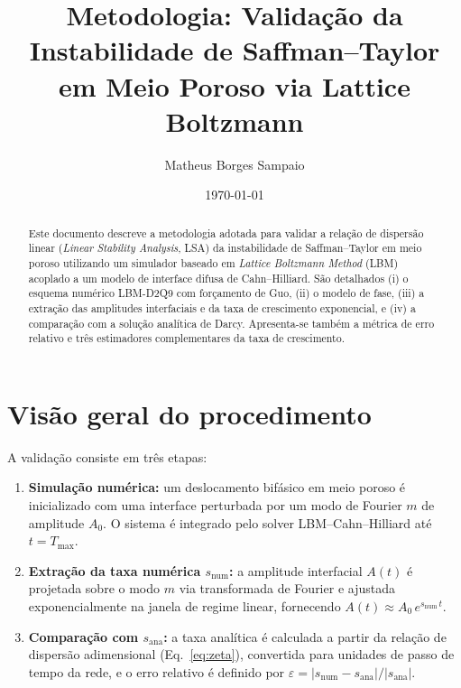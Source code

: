 \documentclass[11pt,a4paper]{article}
\title{Metodologia: Validação da Instabilidade de Saffman--Taylor \\
       em Meio Poroso via Lattice Boltzmann}
\author{Matheus Borges Sampaio}
\date{\today}
\begin{document}
\maketitle

\begin{abstract}
Este documento descreve a metodologia adotada para validar a relação de
dispersão linear (\textit{Linear Stability Analysis}, LSA) da instabilidade
de Saffman--Taylor em meio poroso utilizando um simulador baseado em
\textit{Lattice Boltzmann Method} (LBM) acoplado a um modelo de interface
difusa de Cahn--Hilliard. São detalhados (i) o esquema numérico LBM-D2Q9 com
forçamento de Guo, (ii) o modelo de fase, (iii) a extração das amplitudes
interfaciais e da taxa de crescimento exponencial, e (iv) a comparação com a
solução analítica de Darcy. Apresenta-se também a métrica de erro relativo
e três estimadores complementares da taxa de crescimento.
\end{abstract}

\section{Visão geral do procedimento}

A validação consiste em três etapas:

\begin{enumerate}
    \item \textbf{Simulação numérica:} um deslocamento bifásico em meio
    poroso é inicializado com uma interface perturbada por um modo de
    Fourier $m$ de amplitude $A_0$. O sistema é integrado pelo solver
    LBM--Cahn--Hilliard até $t = T_{\max}$.

    \item \textbf{Extração da taxa numérica $s_{\mathrm{num}}$:} a amplitude
    interfacial $A(t)$ é projetada sobre o modo $m$ via transformada de
    Fourier e ajustada exponencialmente na janela de regime linear,
    fornecendo $A(t) \approx A_0\,e^{s_{\mathrm{num}}\,t}$.

    \item \textbf{Comparação com $s_{\mathrm{ana}}$:} a taxa analítica é
    calculada a partir da relação de dispersão adimensional (Eq.\ \ref{eq:zeta}),
    convertida para unidades de passo de tempo da rede, e o erro relativo
    é definido por $\varepsilon = |s_{\mathrm{num}} - s_{\mathrm{ana}}| /
    |s_{\mathrm{ana}}|$.
\end{enumerate}
\end{document}
